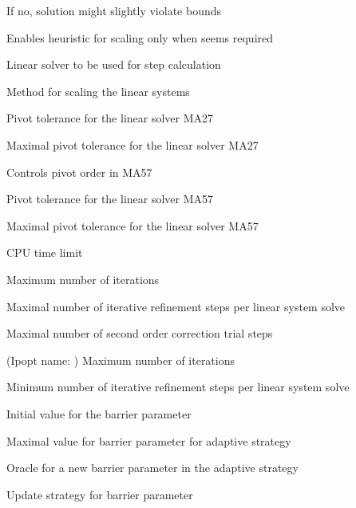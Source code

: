 \begin{description}
\item[{}] If no, solution might slightly violate bounds
\item[{}] Enables heuristic for scaling only when seems required
\item[{}] Linear solver to be used for step calculation
\item[{}] Method for scaling the linear systems
\item[{}] Pivot tolerance for the linear solver MA27
\item[{}] Maximal pivot tolerance for the linear solver MA27
\item[{}] Controls pivot order in MA57
\item[{}] Pivot tolerance for the linear solver MA57
\item[{}] Maximal pivot tolerance for the linear solver MA57
\item[{}] CPU time limit
\item[{}] Maximum number of iterations
\item[{}] Maximal number of iterative refinement steps per linear system solve
\item[{}] Maximal number of second order correction trial steps
\item[{}] (Ipopt name: ) Maximum number of iterations
\item[{}] Minimum number of iterative refinement steps per linear system solve
\item[{}] Initial value for the barrier parameter
\item[{}] Maximal value for barrier parameter for adaptive strategy
\item[{}] Oracle for a new barrier parameter in the adaptive strategy
\item[{}] Update strategy for barrier parameter

\end{description}
